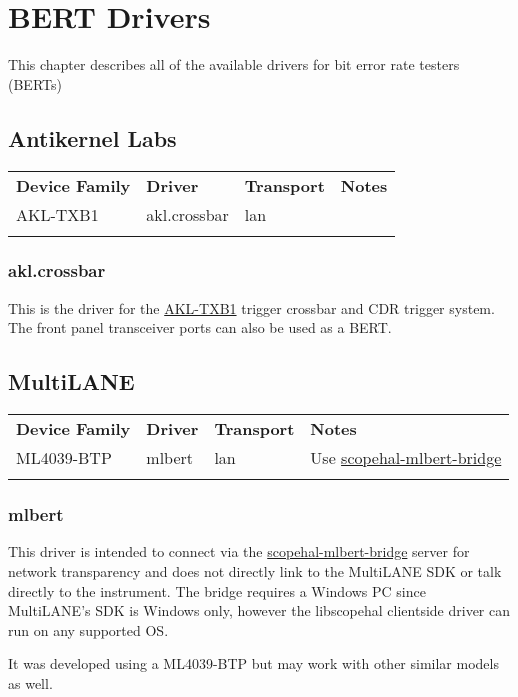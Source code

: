\chapter{BERT Drivers}
\label{sec:bert-drivers}

This chapter describes all of the available drivers for bit error rate testers (BERTs)

\section{Antikernel Labs}

\begin{tabularx}{16cm}{lllX}
\thickhline
\textbf{Device Family} & \textbf{Driver} & \textbf{Transport} & \textbf{Notes} \\
\thickhline
AKL-TXB1 & akl.crossbar & lan &  \\
\thickhline
\end{tabularx}

\subsection{akl.crossbar}

This is the driver for the \href{https://github.com/azonenberg/trigger-crossbar}{AKL-TXB1} trigger crossbar and CDR
trigger system. The front panel transceiver ports can also be used as a BERT.

\section{MultiLANE}

\begin{tabularx}{16cm}{lllX}
\thickhline
\textbf{Device Family} & \textbf{Driver} & \textbf{Transport} & \textbf{Notes} \\
\thickhline
ML4039-BTP & mlbert & lan & Use \href{https://github.com/ngscopeclient/scopehal-mlbert-bridge}{scopehal-mlbert-bridge} \\
\thickhline
\end{tabularx}

\subsection{mlbert}

This driver is intended to connect via the
\href{https://github.com/ngscopeclient/scopehal-mlbert-bridge}{scopehal-mlbert-bridge} server for network transparency
and does not directly link to the MultiLANE SDK or talk directly to the instrument. The bridge requires a Windows PC
since MultiLANE's SDK is Windows only, however the libscopehal clientside driver can run on any supported OS.

It was developed using a ML4039-BTP but may work with other similar models as well.

